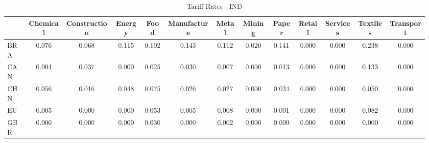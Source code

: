 \begin{table}[htbp]
\centering
\caption{Tariff Rates - IND} 
\label{tab:tariff_IND}
\begin{tabular}{lcccccccccccc}
  \hline
 & Chemical & Construction & Energy & Food & Manufacture & Metal & Mining & Paper & Retail & Services & Textiles & Transport \\ 
  \hline
BRA & \textcolor[RGB]{32,21,223}{0.076} & \textcolor[RGB]{36,23,219}{0.068} & \textcolor[RGB]{19,12,236}{0.115} & \textcolor[RGB]{23,15,232}{0.102} & \textcolor[RGB]{8,5,246}{0.143} & \textcolor[RGB]{21,14,234}{0.112} & \textcolor[RGB]{100,65,155}{0.020} & \textcolor[RGB]{11,7,244}{0.141} & \textcolor[RGB]{255,165,0}{0.000} & \textcolor[RGB]{255,165,0}{0.000} & \textcolor[RGB]{0,0,255}{0.238} & \textcolor[RGB]{255,165,0}{0.000} \\ 
  CAN & \textcolor[RGB]{119,77,136}{0.004} & \textcolor[RGB]{62,40,193}{0.037} & \textcolor[RGB]{132,85,123}{0.000} & \textcolor[RGB]{87,56,168}{0.025} & \textcolor[RGB]{74,48,181}{0.030} & \textcolor[RGB]{110,72,144}{0.007} & \textcolor[RGB]{255,165,0}{0.000} & \textcolor[RGB]{106,69,149}{0.013} & \textcolor[RGB]{255,165,0}{0.000} & \textcolor[RGB]{255,165,0}{0.000} & \textcolor[RGB]{15,10,240}{0.133} & \textcolor[RGB]{255,165,0}{0.000} \\ 
  CHN & \textcolor[RGB]{45,29,210}{0.056} & \textcolor[RGB]{104,67,151}{0.016} & \textcolor[RGB]{55,36,200}{0.048} & \textcolor[RGB]{34,22,221}{0.075} & \textcolor[RGB]{85,55,170}{0.026} & \textcolor[RGB]{81,52,174}{0.027} & \textcolor[RGB]{255,165,0}{0.000} & \textcolor[RGB]{68,44,187}{0.034} & \textcolor[RGB]{255,165,0}{0.000} & \textcolor[RGB]{255,165,0}{0.000} & \textcolor[RGB]{53,34,202}{0.050} & \textcolor[RGB]{255,165,0}{0.000} \\ 
  EU & \textcolor[RGB]{115,74,140}{0.005} & \textcolor[RGB]{134,87,121}{0.000} & \textcolor[RGB]{255,165,0}{0.000} & \textcolor[RGB]{49,32,206}{0.053} & \textcolor[RGB]{113,73,142}{0.005} & \textcolor[RGB]{108,70,147}{0.008} & \textcolor[RGB]{255,165,0}{0.000} & \textcolor[RGB]{128,82,128}{0.001} & \textcolor[RGB]{255,165,0}{0.000} & \textcolor[RGB]{255,165,0}{0.000} & \textcolor[RGB]{28,18,227}{0.082} & \textcolor[RGB]{255,165,0}{0.000} \\ 
  GBR & \textcolor[RGB]{134,87,121}{0.000} & \textcolor[RGB]{255,165,0}{0.000} & \textcolor[RGB]{255,165,0}{0.000} & \textcolor[RGB]{72,47,183}{0.030} & \textcolor[RGB]{255,165,0}{0.000} & \textcolor[RGB]{121,78,134}{0.002} & \textcolor[RGB]{255,165,0}{0.000} & \textcolor[RGB]{255,165,0}{0.000} & \textcolor[RGB]{255,165,0}{0.000} & \textcolor[RGB]{255,165,0}{0.000} & \textcolor[RGB]{255,165,0}{0.000} & \textcolor[RGB]{255,165,0}{0.000} \\ 

\end{tabular}
\end{table}
